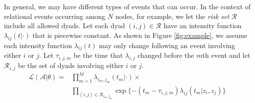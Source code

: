 \documentclass{article}
\begin{document}
In general, we may have different types of events that can occur.   In the context of relational events occurring among $N$ nodes, for example, we let the \emph{risk set} $\mathcal{R}$ include all allowed dyads.  Let each dyad $(i,j) \in \mathcal{R}$ have an intensity function $\lambda_{ij}(t|\cdot)$ that is piecewise constant.  As shown in Figure \ref{fig:example}, we assume each intensity function $\lambda_{ij}(t)$ may only change following an event involving either $i$ or $j$.  Let $\tau_{i,j,m}$ be the time that $\lambda_{i,j}$ changed before the $m$th event and let $\mathcal{R}_{i,j}$ be the set of dyads involving either $i$ or $j$.  %
\begin{align}
\mathcal{L}(\mathcal{A}|\theta) =& \prod_{m=1}^M 
\lambda_{i_m,j_m}(t_m|\cdot) \times \\
&\prod_{(i,j) \in \mathcal{R}_{i_m,j_m}}\exp\{ - (t_m - \tau_{i,j,m})
\lambda_{ij}(t_m | z_i,z_j) \}
\label{eqn:llk}
\end{align}
\end{document}
